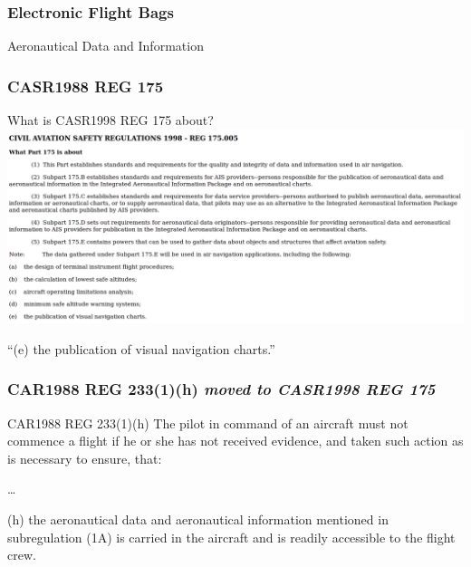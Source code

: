 \begin{frame}
\frametitle{Electronic Flight Bags}
\begin{center}
Aeronautical Data and Information
\end{center}
\end{frame}

\begin{frame}
\frametitle{CASR1988 REG 175}
\begin{block}{What is CASR1998 REG 175 about?}
\includegraphics[height=0.5\textheight]{image/casr175_005.png}
\end{block}
\par
``(e) the publication of visual navigation charts.''
\end{frame}

\begin{frame}
\frametitle{CAR1988 REG 233(1)(h) \emph{moved to CASR1998 REG 175}}
\scriptsize
\begin{block}{CAR1988 REG 233(1)(h)}
The pilot in command of an aircraft must not commence a flight if he or she has not received evidence, and taken such action as is necessary to ensure, that:
\par
\ldots
\par
(h)  the aeronautical data and aeronautical information mentioned in subregulation (1A) is carried in the aircraft and is readily accessible to the flight crew.
\end{block}
\par
\end{frame}

